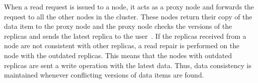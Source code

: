 		

When a read request is issued to a node,  it acts as a proxy node and forwards
the request to all the other nodes in the cluster.
These nodes return their copy of the data item to the proxy node and the proxy
node  checks the versions of the replicas and sends the latest replica to the
user~\citep{datastaxRead}.   If the replicas received from a node are not
consistent with other replicas, a read repair is performed on the node
with the outdated replicas.  This means that the nodes with outdated replicas
are sent a write operation with the latest data.
Thus,  data consistency is maintained whenever conflicting versions of data
items are found.



